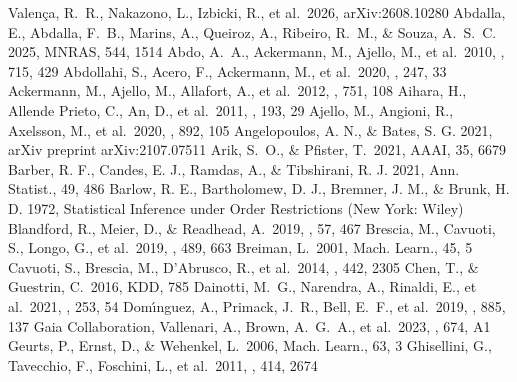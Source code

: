 \documentclass[twocolumn,linenumbers,floatfix]{aastex701}
\begin{document}
\clearpage
\begin{thebibliography}{}
\setlength{\itemsep}{1.5pt}
\setlength{\parskip}{0pt}
\small
{} Valen\c{c}a, R.~R., Nakazono, L., Izbicki, R., et al.\ 2026, arXiv:2608.10280
 Abdalla, E., Abdalla, F.~B., Marins, A., Queiroz, A., Ribeiro, R.~M., \& Souza, A.~S.~C. 2025, MNRAS, 544, 1514
 Abdo, A.~A., Ackermann, M., Ajello, M., et al.\ 2010, \apj, 715, 429
 Abdollahi, S., Acero, F., Ackermann, M., et al.\ 2020, \apjs, 247, 33
 Ackermann, M., Ajello, M., Allafort, A., et al.\ 2012, \apj, 751, 108
 Aihara, H., Allende Prieto, C., An, D., et al.\ 2011, \apjs, 193, 29
 Ajello, M., Angioni, R., Axelsson, M., et al.\ 2020, \apj, 892, 105
 Angelopoulos, A. N., \& Bates, S. G. 2021, arXiv preprint arXiv:2107.07511
 Arik, S.~O., \& Pfister, T.\ 2021, AAAI, 35, 6679
 Barber, R. F., Candes, E. J., Ramdas, A., \& Tibshirani, R. J. 2021, Ann. Statist., 49, 486
 Barlow, R. E., Bartholomew, D. J., Bremner, J. M., \& Brunk, H. D. 1972, Statistical Inference under Order Restrictions (New York: Wiley)
 Blandford, R., Meier, D., \& Readhead, A.\ 2019, \araa, 57, 467
 Brescia, M., Cavuoti, S., Longo, G., et al.\ 2019, \mnras, 489, 663
 Breiman, L.\ 2001, Mach. Learn., 45, 5
 Cavuoti, S., Brescia, M., D'Abrusco, R., et al.\ 2014, \mnras, 442, 2305
 Chen, T., \& Guestrin, C.\ 2016, KDD, 785
 Dainotti, M.~G., Narendra, A., Rinaldi, E., et al.\ 2021, \apjs, 253, 54
 Dom{\'\i}nguez, A., Primack, J.~R., Bell, E.~F., et al.\ 2019, \apj, 885, 137
 Gaia Collaboration, Vallenari, A., Brown, A.~G.~A., et al.\ 2023, \aap, 674, A1
 Geurts, P., Ernst, D., \& Wehenkel, L.\ 2006, Mach. Learn., 63, 3
 Ghisellini, G., Tavecchio, F., Foschini, L., et al.\ 2011, \mnras, 414, 2674

\end{thebibliography}
\end{document}
